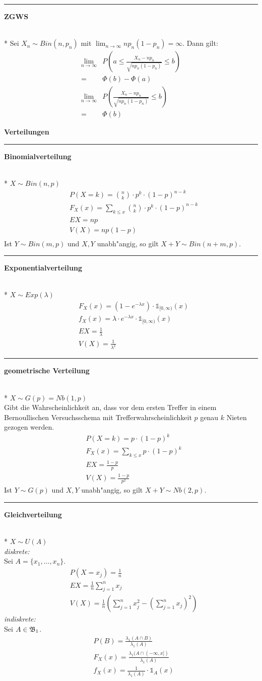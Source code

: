 \documentclass{article}
\newcommand{\h}[1]{\vspace{1ex}\begin{center}\small\textbf{#1}\end{center}}
\newcommand{\hh}[1]{{\vspace{1pt}\hrule\vspace{1pt} \noindent\textbf{#1}}\\*}
\newcommand{\hhh}[1]{{\vspace{1pt}\noindent\emph{#1:}}}
\begin{document}
\begin{multicols}{4}
\hh{ZGWS}
Sei $X_n\sim Bin(n,p_n)$ mit $\lim_{n\to\infty} np_n(1-p_n)=\infty$. Dann gilt:
\begin{align*}
\lim_{n\to\infty} &P\left(a\le\frac{X_n-np_n}{\sqrt{np_n(1-p_n)}}\le b\right)\\
 = &\Phi(b)-\Phi(a)\\
\lim_{n\to\infty} &P\left(\frac{X_n-np_n}{\sqrt{np_n(1-p_n)}}\le b\right)\\
 = &\Phi(b)
\end{align*}


\h{Verteilungen}
\hh{Binomialverteilung}
$X\sim Bin(n,p)$
\begin{align*}
&P(X=k)={n\choose k}\cdot p^k\cdot (1-p)^{n-k}\\
&F_X(x)=\sum_{k\le x} {n\choose k}\cdot p^k\cdot (1-p)^{n-k}\\
&EX = np\\
&V(X)=np(1-p)\\
\end{align*}
Ist $Y\sim Bin(m,p)$ und $X,Y$ unabh"angig, so gilt $X+Y\sim Bin(n+m,p)$.


\hh{Exponentialverteilung}
$X\sim Exp(\lambda)$
\begin{align*}
&F_X(x)=(1-e^{-\lambda x})\cdot\mathds{1}_{[0,\infty)}(x)\\
&f_X(x)=\lambda\cdot e^{-\lambda x}\cdot\mathds{1}_{[0,\infty)}(x)\\
&EX=\frac1\lambda\\
&V(X)=\frac1{\lambda^2}
\end{align*}


\hh{geometrische Verteilung}
$X\sim G(p)=Nb(1,p)$\\
Gibt die Wahrscheinlichkeit an, dass vor dem ersten Treffer in einem Bernoullischen Versuchsschema mit Trefferwahrscheinlichkeit $p$ genau $k$ Nieten gezogen werden.
\begin{align*}
&P(X=k)=p\cdot(1-p)^{k}\\
&F_X(x)=\sum_{k\le x}p\cdot (1-p)^{k}\\
&EX=\frac{1-p}p\\
&V(X)=\frac{1-p}{p^2}
\end{align*}
Ist $Y\sim G(p)$ und $X,Y$ unabh"angig, so gilt $X+Y\sim Nb(2,p)$.

\hh{Gleichverteilung}
$X\sim U(A)$\\
\hhh{diskrete}\\
Sei $A=\{x_1,\ldots,x_n\}$.
\begin{align*}
&P(X=x_j)=\frac1n\\
&EX=\frac1n\sum_{j=1}^n x_j\\
&V(X)=\frac1n\left(\sum_{j=1}^n x_j^2-\left(\sum_{j=1}^n x_j\right)^2\right)
\end{align*}
\hhh{indiskrete}\\
Sei $A\in\frak{B}_1$.
\begin{align*}
&P(B)=\frac{\lambda_1(A\cap B)}{\lambda_1(A)}\\
&F_X(x)=\frac{\lambda_1(A\cap (-\infty,x])}{\lambda_1(A)}\\
&f_X(x)=\frac1{\lambda_1(A)}\cdot\mathds{1}_A(x)
\end{align*}


\end{multicols}
\end{document}

